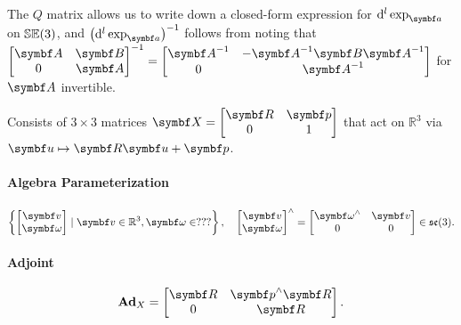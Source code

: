 The $Q$ matrix allows us to write down a closed-form expression for $\mathrm{d}^l \exp_\a$ on $\SEthree$, and $\left( \mathrm{d}^l \exp_\a\right)^{-1}$ follows from noting that $\begin{bmatrix} \A & \B \\ 0 & \A \end{bmatrix}^{-1} = \begin{bmatrix} \A^{-1} & -\A^{-1} \B \A^{-1} \\ 0 & \A^{-1} \end{bmatrix}$ for $\A$ invertible.

\begin{properties}[breakable, title={$\SEthree$ formula sheet}]
  Consists of $3 \times 3$ matrices $\X = \begin{bmatrix} \bR & \bp \\ 0 & 1 \end{bmatrix}$ that act on $\mathbb{R}^3$ via $\bu \mapsto \bR \bu + \bp$.

  \paragraph{Algebra Parameterization}
  \begin{equation}
    \left\{ \begin{bmatrix}
      \bv \\ \bomega
    \end{bmatrix} \mid \bv \in \mathbb{R}^3, \bomega \in ??? \right\}, \quad \begin{bmatrix}
      \bv \\ \bomega
    \end{bmatrix}^\wedge = \begin{bmatrix}
      \bomega^\wedge & \bv \\ 0 & 0
    \end{bmatrix} \in \sethree.
  \end{equation}

  \paragraph{Adjoint}
  \begin{equation}
    \bAd_X = \begin{bmatrix}
      \bR & \bp^\wedge \bR \\ 0 & \bR
    \end{bmatrix}.
  \end{equation}


\end{properties}
